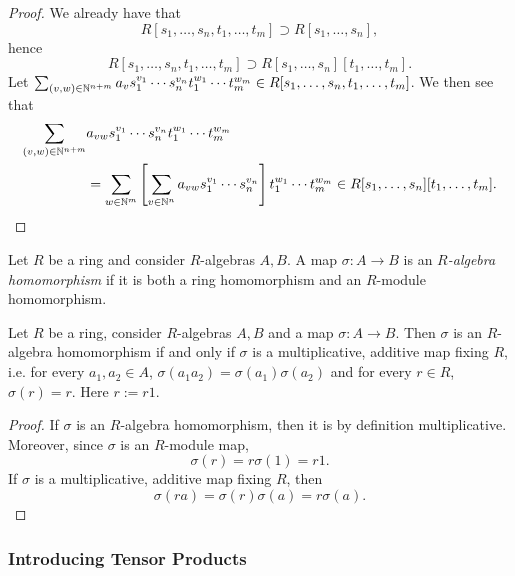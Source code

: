 \begin{proof}
    We already have that 
    $$
        R[s_1,\dots,s_n,t_1,\dots,t_m]\supset R[s_1,\dots,s_n], 
    $$
    hence
    $$
        R[s_1,\dots,s_n,t_1,\dots,t_m]\supset R[s_1,\dots,s_n][t_1,\dots,t_m].
    $$ 
    Let $\sum_{(v,w)\in\mathbb{N}^{n+m}} a_vs_1^{v_1}\cdots s_n^{v_n}t_1^{w_1}\cdots t_m^{w_m}\in R[s_1,\dots,s_n,t_1,\dots,t_m]$. We then see that 
    \begin{align*}
        \sum_{(v,w)\in\mathbb{N}^{n+m}} &a_{vw}s_1^{v_1}\cdots s_n^{v_n}t_1^{w_1}\cdots t_m^{w_m}\\ 
        &= \sum_{w\in \mathbb{N}^m}\left[\sum_{v\in \mathbb{N}^n} a_{vw}s_1^{v_1}\cdots s_n^{v_n}\right] t_1^{w_1}\cdots t_m^{w_m}\in R[s_1,\dots,s_n][t_1,\dots,t_m].
    \end{align*}
\end{proof}
\begin{definition}
    Let $R$ be a ring and consider $R$-algebras $A,B$. A map $\sigma : A\rightarrow B$ is an \textit{$R$-algebra homomorphism} if it is both a ring homomorphism and an $R$-module homomorphism.
\end{definition}
\begin{lemma}
    Let $R$ be a ring, consider $R$-algebras $A,B$ and a map $\sigma : A\rightarrow B$. Then $\sigma$ is an $R$-algebra homomorphism if and only if $\sigma$ is a multiplicative, additive map fixing $R$, i.e. for every $a_1,a_2\in A$, $\sigma(a_1a_2)=\sigma(a_1)\sigma(a_2)$ and for every $r\in R$, $\sigma(r) = r$. Here $r := r1$.
\end{lemma}
\begin{proof}
    If $\sigma$ is an $R$-algebra homomorphism, then it is by definition multiplicative. Moreover, since $\sigma$ is an $R$-module map, 
    $$
        \sigma(r)=r\sigma(1)= r1.
    $$
    If $\sigma$ is a multiplicative, additive map fixing $R$, then 
    $$
        \sigma(ra)=\sigma(r)\sigma(a)=r\sigma(a).
    $$
\end{proof}
\subsubsection{Introducing Tensor Products}
\begin{definition}
    
\end{definition}
